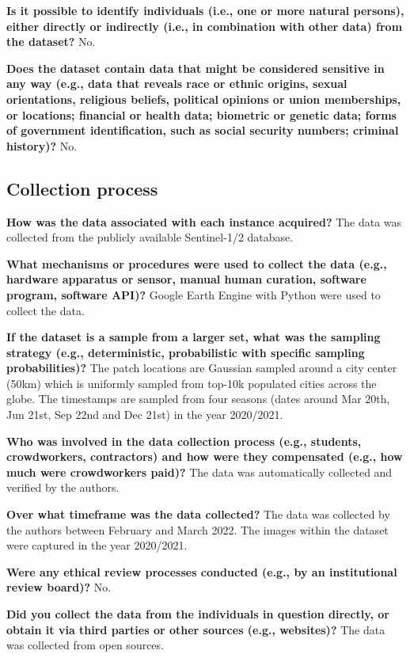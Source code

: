 \documentclass[lettersize,journal]{IEEEtran}
\begin{document}
\textbf{Is it possible to identify individuals (i.e., one or more natural persons), either directly or indirectly (i.e., in combination with other data) from the dataset?} No.

\textbf{Does the dataset contain data that might be considered sensitive in any way (e.g., data that reveals race or ethnic origins, sexual orientations, religious beliefs, political opinions or union memberships, or
locations; financial or health data; biometric or genetic data; forms of government identification, such as social security numbers; criminal history)?} No.

\subsection{Collection process}

\textbf{How was the data associated with each instance acquired?} The data was collected from the publicly available Sentinel-1/2 database. 

\textbf{What mechanisms or procedures were used to collect the data (e.g., hardware apparatus or
sensor, manual human curation, software program, software API)?} Google Earth Engine with Python were used to collect the data.

\textbf{If the dataset is a sample from a larger set, what was the sampling strategy (e.g., deterministic,
probabilistic with specific sampling probabilities)?} The patch locations are Gaussian sampled around a city center (50km) which is uniformly sampled from top-10k populated cities across the globe. The timestamps are sampled from four seasons (dates around Mar 20th, Jun 21st, Sep 22nd and Dec 21st) in the year 2020/2021.

\textbf{Who was involved in the data collection process (e.g., students, crowdworkers, contractors) and how were they compensated (e.g., how much were crowdworkers paid)?} The data was automatically collected and verified by the authors.

\textbf{Over what timeframe was the data collected?} The data was collected by the authors between February and March 2022. The images within the dataset were captured in the year 2020/2021.

\textbf{Were any ethical review processes conducted (e.g., by an institutional review board)?} No.

\textbf{Did you collect the data from the individuals in question directly, or obtain it via third parties or other sources (e.g., websites)?} The data was collected from open sources.
\end{document}
